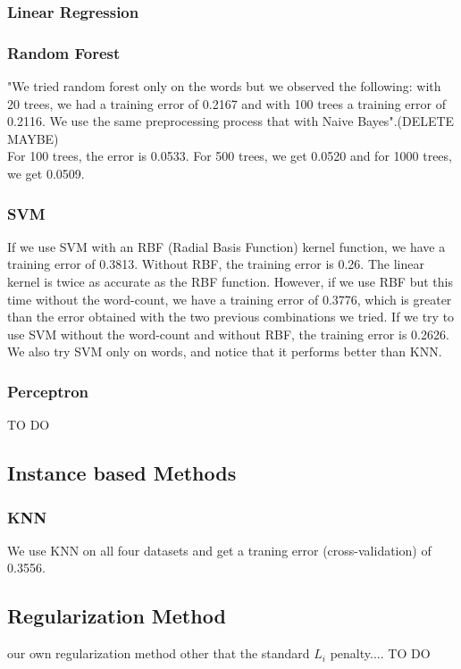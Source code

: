\documentclass[11pt,twocolumn]{report}
\begin{document}
    \subsubsection{Linear Regression}
    
    
     \subsubsection{Random Forest}
     "We tried random forest only on the words but we observed the following: with 20 trees, we had a training error of 0.2167 and with 100 trees a training error of 0.2116. We use the same preprocessing process that with Naive Bayes".(DELETE MAYBE)\\
     For 100 trees, the error is 0.0533. For 500 trees, we get 0.0520 and for 1000 trees, we get 0.0509.
    \subsubsection{SVM}
    
    If we use SVM with an RBF (Radial Basis Function) kernel function, we have a training error of 0.3813. Without RBF, the training error is 0.26. The linear kernel is twice as accurate as the RBF function. However, if we use RBF but this time without the word-count, we have a training error of 0.3776, which is greater than the error obtained with the two previous combinations we tried. If we try to use SVM without the word-count and without RBF, the training error is 0.2626. We also try SVM only on words, and notice that it performs better than KNN.
    
    \subsubsection*{Perceptron}
    TO DO
    \subsection*{Instance based Methods}
    \subsubsection{KNN}
    
    We use KNN on all four datasets and get a traning error (cross-validation) of 0.3556.
   
    \subsection*{Regularization Method}
    our own regularization method other that the standard $L_i$ penalty....
    TO DO
\end{document}
